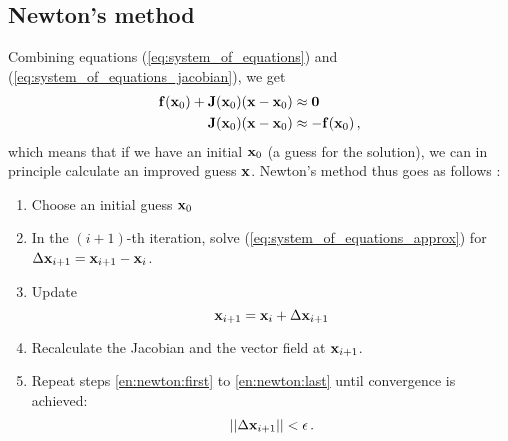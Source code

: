     \subsection{Newton's method} \label{sec:systems_of_equations:newton}
        Combining equations (\ref{eq:system_of_equations}) and (\ref{eq:system_of_equations_jacobian}), we get
        \begin{align}
            \vb{f}(\vb{x}_0) + \vb{J}(\vb{x}_0) (\vb{x} - \vb{x}_0) &\approx \vb{0} \\
            \vb{J}(\vb{x}_0) (\vb{x} - \vb{x}_0) & \approx - \vb{f}(\vb{x}_0) \label{eq:system_of_equations_approx} \thinspace ,
        \end{align}
        which means that if we have an initial $\vb{x}_0$ (a guess for the solution), we can in principle calculate an improved guess $\vb{x}$. Newton's method thus goes as follows \cite{Burden2011}:
        \begin{enumerate}
            \item Choose an initial guess $\vb{x}_0$
            \item \label{en:newton:first} In the $(i+1)$-th iteration, solve (\ref{eq:system_of_equations_approx}) for $\Delta \vb{x}_{i+1} = \vb{x}_{i+1} - \vb{x}_i$.
            \item Update
                \begin{equation}
                    \vb{x}_{i+1} = \vb{x}_i + \Delta \vb{x}_{i+1}
                \end{equation}
            \item \label{en:newton:last} Recalculate the Jacobian and the vector field at $\vb{x}_{i+1}$.
            \item Repeat steps \ref{en:newton:first} to \ref{en:newton:last} until convergence is achieved:
                \begin{equation}
                    || \Delta \vb{x}_{i+1} || < \epsilon \thinspace .
                \end{equation}
        \end{enumerate}

